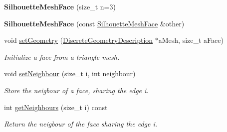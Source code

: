 \begin{DoxyCompactItemize}
\item 
\mbox{\label{classvisilib_1_1_silhouette_mesh_face_a3964d6c8e62c17c8372fa69e9084889f}} 
{\bfseries Silhouette\+Mesh\+Face} (size\+\_\+t n=3)
\item 
\mbox{\label{classvisilib_1_1_silhouette_mesh_face_a7dc0c8bc6b150ecca7307eb3f0c85bcd}} 
{\bfseries Silhouette\+Mesh\+Face} (const \mbox{\hyperlink{classvisilib_1_1_silhouette_mesh_face}{Silhouette\+Mesh\+Face}} \&other)
\item 
\mbox{\label{classvisilib_1_1_silhouette_mesh_face_acb6f95afd112046d3ba4ae5bd9738e25}} 
void \mbox{\hyperlink{classvisilib_1_1_silhouette_mesh_face_acb6f95afd112046d3ba4ae5bd9738e25}{set\+Geometry}} (\mbox{\hyperlink{structvisilib_1_1_discrete_geometry_description}{Discrete\+Geometry\+Description}} $\ast$a\+Mesh, size\+\_\+t a\+Face)
\begin{DoxyCompactList}\small\item\em Initialize a face from a triangle mesh. \end{DoxyCompactList}\item 
\mbox{\label{classvisilib_1_1_silhouette_mesh_face_a481d2d1b6544e3be14c55842ee37ab0a}} 
void \mbox{\hyperlink{classvisilib_1_1_silhouette_mesh_face_a481d2d1b6544e3be14c55842ee37ab0a}{set\+Neighbour}} (size\+\_\+t i, int neighbour)
\begin{DoxyCompactList}\small\item\em Store the neigbour of a face, sharing the edge i. \end{DoxyCompactList}\item 
\mbox{\label{classvisilib_1_1_silhouette_mesh_face_aaaab9df89dcf72e9a039b1556762f0c3}} 
int \mbox{\hyperlink{classvisilib_1_1_silhouette_mesh_face_aaaab9df89dcf72e9a039b1556762f0c3}{get\+Neighbours}} (size\+\_\+t i) const
\begin{DoxyCompactList}\small\item\em Return the neigbour of the face sharing the edge i. \end{DoxyCompactList}\item 

\end{DoxyCompactItemize}
